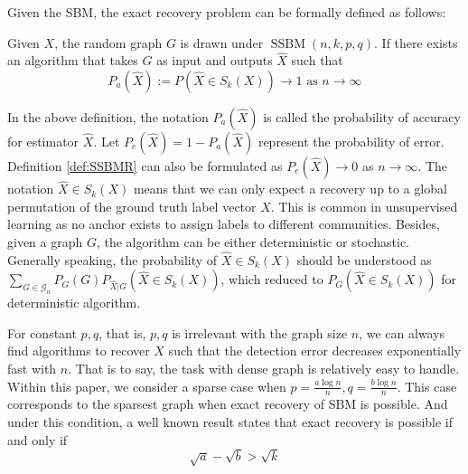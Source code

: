 \documentclass[entropy,article,submit,moreauthors,pdftex]{Definitions/mdpi}
\newcommand{\A}{\frac{a \log n}{n}}
\newcommand{\B}{\frac{b \log n}{n}}
\newcommand{\cG}{\mathcal{G}}
\newcommand{\1}{\mathbbm{1}}
\DeclareMathOperator{\SSBM}{SSBM}
\begin{document}
Given the SBM, the exact recovery problem can be formally defined as follows:
\begin{Definition} \label{def:SSBMR}
Given $X$, the random graph $G$ is drawn under $\SSBM(n,k,p,q)$. If there exists an algorithm that takes
$G$ as input and outputs $\hat{X}$ such that
\begin{equation*}
P_a(\hat{X}):=P(\hat{X} \in S_k(X)) \to 1 \textrm{ as } n \to \infty
\end{equation*}
\end{Definition}

In the above definition, the notation $P_a(\hat{X})$ is called the probability of accuracy for estimator $\hat{X}$.
Let $P_e(\hat{X}) = 1 - P_a(\hat{X})$ represent the probability of error. Definition \ref{def:SSBMR} can also
be formulated as $P_e(\hat{X}) \to 0$ as $n\to \infty$.
The notation $\hat{X} \in S_k(X)$ means that we can only
expect a recovery up to a global permutation of the ground truth label vector $X$. This is common in unsupervised
learning as no anchor exists to assign labels to different communities.
Besides, given a graph $G$, the algorithm can
be either deterministic or stochastic. Generally speaking, the probability of $\hat{X} \in S_k(X)$ should be understood as 
$\sum_{G \in \cG_n} P_G(G) P_{\hat{X}|G}(\hat{X} \in S_k(X))$, which reduced to 
$P_G(\hat{X} \in S_k(X))$ for deterministic algorithm.

For constant $p,q$, that is, $p,q$ is irrelevant with the graph size $n$,
we can always find algorithms to recover $X$ such that the detection error decreases exponentially
fast with $n$.
That is to say, the task with dense graph is relatively easy to handle. Within this paper, we consider a sparse
case when $p = \A, q = \B$. This case corresponds to the sparsest graph when exact recovery of SBM is possible.
And under this condition, a well known result \cite{abbe2015community} states that
exact recovery is possible if and only if
\begin{equation}\label{eq:abk}
\sqrt{a} - \sqrt{b} > \sqrt{k}
\end{equation}
\end{document}
